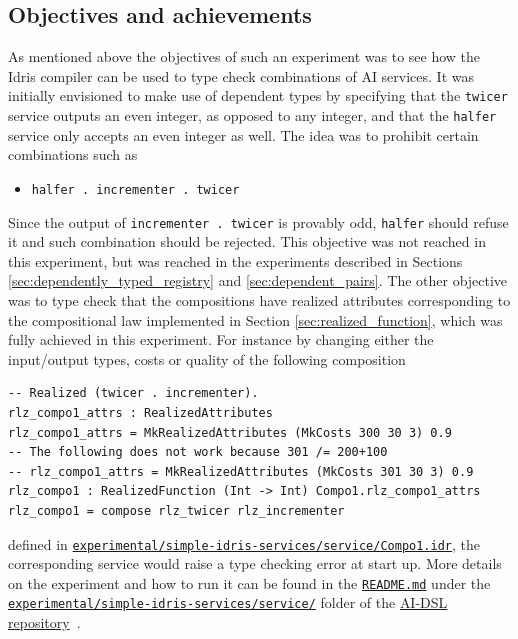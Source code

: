 \documentclass[]{report}
\begin{document}
\subsection{Objectives and achievements}

As mentioned above the objectives of such an experiment was to see how
the Idris compiler can be used to type check combinations of AI
services.  It was initially envisioned to make use of dependent types
by specifying that the \texttt{twicer} service outputs an even
integer, as opposed to any integer, and that the \texttt{halfer}
service only accepts an even integer as well.  The idea was to
prohibit certain combinations such as
\begin{itemize}
\item \texttt{halfer . incrementer . twicer}
\end{itemize}
Since the output of \texttt{incrementer . twicer} is provably odd,
\texttt{halfer} should refuse it and such combination should be
rejected.  This objective was not reached in this experiment, but was
reached in the experiments described in Sections
\ref{sec:dependently_typed_registry} and \ref{sec:dependent_pairs}.
The other objective was to type check that the compositions have
realized attributes corresponding to the compositional law implemented
in Section \ref{sec:realized_function}, which was fully achieved in
this experiment.  For instance by changing either the input/output
types, costs or quality of the following composition
\begin{verbatim}
-- Realized (twicer . incrementer).
rlz_compo1_attrs : RealizedAttributes
rlz_compo1_attrs = MkRealizedAttributes (MkCosts 300 30 3) 0.9
-- The following does not work because 301 /= 200+100
-- rlz_compo1_attrs = MkRealizedAttributes (MkCosts 301 30 3) 0.9
rlz_compo1 : RealizedFunction (Int -> Int) Compo1.rlz_compo1_attrs
rlz_compo1 = compose rlz_twicer rlz_incrementer
\end{verbatim}
defined in
\href{https://github.com/singnet/ai-dsl/blob/master/experimental/simple-idris-services/service/Compo1.idr}{\texttt{experimental/simple-idris-services/service/Compo1.idr}},
the corresponding service would raise a type checking error at start
up.  More details on the experiment and how to run it can be found in
the
\href{https://github.com/singnet/ai-dsl/blob/master/experimental/simple-idris-services/README.md}{\texttt{README.md}}
under the
\href{https://github.com/singnet/ai-dsl/blob/master/experimental/simple-idris-services/}{\texttt{experimental/simple-idris-services/service/}}
folder of the \href{https://github.com/singnet/ai-dsl/}{AI-DSL
  repository}~\cite{AIDSLRepo}.
\end{document}
